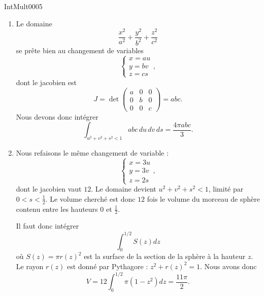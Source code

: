 
\begin{corrige}{IntMult0005}

\begin{enumerate}

\item
Le domaine
\begin{equation}
	\frac{ x^2 }{ a^2 }+\frac{ y^2 }{ b^2 }+\frac{ z^2 }{ c^2 }
\end{equation}
se prête bien au changement de variables
\begin{equation}
	\left\{
\begin{array}{ll}
x=au\\
y=bv\\
z=cs
\end{array}
\right.,
\end{equation}
dont le jacobien est
\begin{equation}
	J=\det\begin{pmatrix}
  a	&	0	&	0\\ 
  0	&	b	&	0\\ 
 0	&	0	& c	  
\end{pmatrix}=abc.
\end{equation}
Nous devons donc intégrer
\begin{equation}
	\int_{u^2+v^2+s^2<1}abc\,du\,dv\,ds=\frac{ 4\pi abc }{ 3 }.
\end{equation}

\item
Nous refaisons le même changement de variable :
\begin{equation}
	\left\{
\begin{array}{ll}
x=3u\\
y=3v\\
z=2s
\end{array}
\right.,
\end{equation}
dont le jacobien vaut $12$. Le domaine devient $u^2+v^2+s^2<1$, limité par $0<s<\frac{1}{ 2 }$. Le volume cherché est donc $12$ fois le volume du morceau de sphère contenu entre les hauteurs $0$ et $\frac{1}{ 2 }$.

Il faut donc intégrer
\begin{equation}
	\int_0^{1/2}S(z)dz
\end{equation}
où $S(z)=\pi r(z)^2$ est la surface de la section de la sphère à la hauteur $z$. Le rayon $r(z)$ est donné par Pythagore : $z^2+r(z)^2=1$. Nous avons donc
\begin{equation}
	V=12\int_0^{1/2}\pi(1-z^2)dz=\frac{ 11\pi }{ 2 }.
\end{equation}


\end{enumerate}
\end{corrige}
